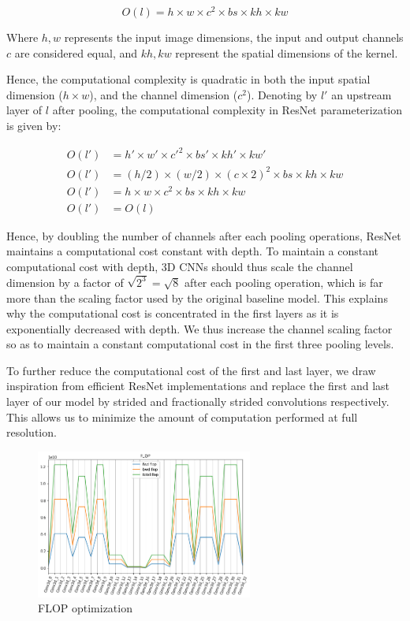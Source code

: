 \documentclass[runningheads]{llncs}
\begin{document}
$$ O(l) = h \times w \times c^2 \times bs  \times kh  \times kw $$

Where $h,w$ represents the input image dimensions, 
the input and output channels $c$ are considered equal, 
and $kh,kw$ represent the spatial dimensions of the kernel.

Hence, the computational complexity is quadratic in both the input spatial dimension ($h \times w$),
and the channel dimension ($c^2$).
Denoting by $l'$ an upstream layer of $l$ after pooling, the computational complexity in ResNet parameterization is given by:


\begin{subequations} 
\begin{align}
O(l') &= h' \times w' \times c'^2 \times bs'  \times kh'  \times kw'  \\
O(l') &= (h/2) \times (w/2) \times (c \times 2)^2 \times bs  \times kh  \times kw   \\
O(l') &= h \times w \times c^2 \times bs  \times kh  \times kw   \\
O(l') &= O(l) 
\end{align}
\end{subequations}


Hence, by doubling the number of channels after each pooling operations, ResNet maintains a computational cost constant with depth.
To maintain a constant computational cost with depth, 3D CNNs should thus scale the channel dimension
by a factor of $\sqrt{2^3}=\sqrt{8}$ after each pooling operation, 
which is far more than the scaling factor used by the original baseline model.
This explains why the computational cost is concentrated in the first layers as 
it is exponentially decreased with depth.
We thus increase the channel scaling factor so as to maintain a constant computational cost in the first three pooling levels.

To further reduce the computational cost of the first and last layer, 
we draw inspiration from efficient ResNet implementations and replace the first and
last layer of our model by strided and fractionally strided convolutions respectively.
This allows us to minimize the amount of computation performed at full resolution.

\begin{figure}[h]
\centering
\includegraphics[width=2.8in]{optimize_model_FLOP.png}
\caption{FLOP optimization}
\end{figure}%
\end{document}
